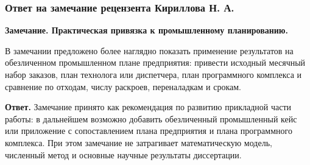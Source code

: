 


\begin{frame}
    \frametitle{Ответ на замечание рецензента Кириллова Н. А.}
    \scriptsize

    \textbf{Замечание. Практическая привязка к промышленному планированию.}

    В замечании предложено более наглядно показать применение результатов
    на обезличенном промышленном плане предприятия: привести исходный
    месячный набор заказов, план технолога или диспетчера, план программного
    комплекса и сравнение по отходам, числу раскроев, переналадкам и срокам.

    \vspace{0.15cm}
    \textbf{Ответ.}
    Замечание принято как рекомендация по развитию прикладной части работы:
    в дальнейшем возможно добавить обезличенный промышленный кейс или
    приложение с сопоставлением плана предприятия и плана программного
    комплекса. При этом замечание не затрагивает математическую модель,
    численный метод и основные научные результаты диссертации.
\end{frame}


